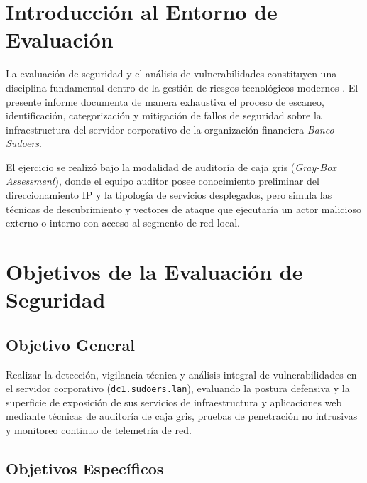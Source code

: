 
\section{Introducción al Entorno de Evaluación}

La evaluación de seguridad y el análisis de vulnerabilidades constituyen una disciplina fundamental dentro de la gestión de riesgos tecnológicos modernos \citep{nist_sp800_115}. El presente informe documenta de manera exhaustiva el proceso de escaneo, identificación, categorización y mitigación de fallos de seguridad sobre la infraestructura del servidor corporativo de la organización financiera \textit{Banco Sudoers}.

El ejercicio se realizó bajo la modalidad de auditoría de caja gris (\textit{Gray-Box Assessment}), donde el equipo auditor posee conocimiento preliminar del direccionamiento IP y la tipología de servicios desplegados, pero simula las técnicas de descubrimiento y vectores de ataque que ejecutaría un actor malicioso externo o interno con acceso al segmento de red local.

\section{Objetivos de la Evaluación de Seguridad}

\subsection{Objetivo General}

Realizar la detección, vigilancia técnica y análisis integral de vulnerabilidades en el servidor corporativo (\texttt{dc1.sudoers.lan}), evaluando la postura defensiva y la superficie de exposición de sus servicios de infraestructura y aplicaciones web mediante técnicas de auditoría de caja gris, pruebas de penetración no intrusivas y monitoreo continuo de telemetría de red.

\subsection{Objetivos Específicos}

